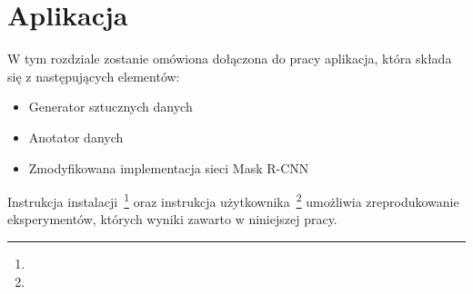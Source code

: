 \chapter{Aplikacja}

W tym rozdziale zostanie omówiona dołączona do pracy aplikacja, która składa się z następujących elementów:
\begin{itemize}
  \item Generator sztucznych danych
  \item Anotator danych
  \item Zmodyfikowana implementacja sieci Mask R-CNN \cite{matterport-mask-rcnn}
\end{itemize}
Instrukcja instalacji~\footnote{} oraz instrukcja użytkownika~\footnote{} umożliwia zreprodukowanie eksperymentów, których wyniki zawarto w niniejszej pracy.
